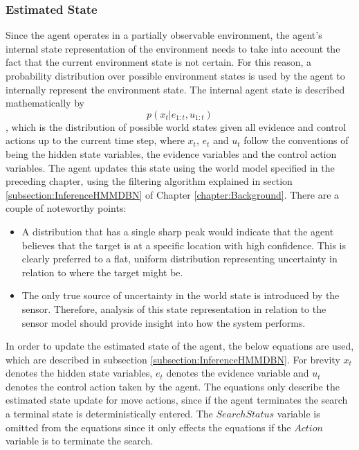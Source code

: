 \subsubsection{Estimated State}
\workinprogress
Since the agent operates in a partially observable environment, the agent's internal state representation of the environment needs to take into account the fact that the current environment state is not certain. For this reason, a probability distribution over possible environment states is used by the agent to internally represent the environment state. The internal agent state is described mathematically by 
\[p(x_t | e_{1:t}, u_{1:t})\]
, which is the distribution of possible world states given all evidence and control actions up to the current time step, where $x_t$, $e_t$ and $u_t$ follow the conventions of being the hidden state variables, the evidence variables and the control action variables. The agent updates this state using the world model specified in the preceding chapter, using the filtering algorithm explained in section \ref{subsection:InferenceHMMDBN} of Chapter \ref{chapter:Background}. There are a couple of noteworthy points:
\begin{itemize}
    \item A distribution that has a single sharp peak would indicate that the agent believes that the target is at a specific location with high confidence. This is clearly preferred to a flat, uniform distribution representing uncertainty in relation to where the target might be.
    \item The only true source of uncertainty in the world state is introduced by the sensor. Therefore, analysis of this state representation in relation to the sensor model should provide insight into how the system performs.
\end{itemize}
In order to update the estimated state of the agent, the below equations are used, which are described in subsection \ref{subsection:InferenceHMMDBN}. For brevity $x_t$ denotes the hidden state variables, $e_t$ denotes the evidence variable and $u_t$ denotes the control action taken by the agent. The equations only describe the estimated state update for move actions, since if the agent terminates the search a terminal state is deterministically entered. The $SearchStatus$ variable is omitted from the equations since it only effects the equations if the $Action$ variable is to terminate the search.
\footnotesize
